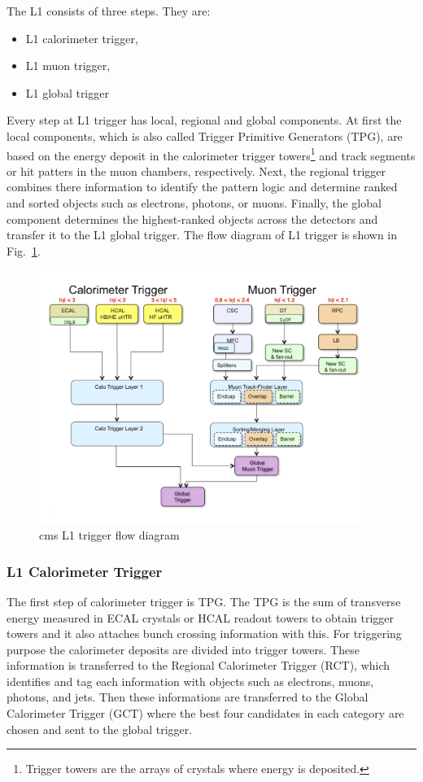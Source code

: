 The L1 consists of three steps. They are:
\begin{itemize}
	\item L1 calorimeter trigger,
	\item L1 muon trigger,
	\item L1 global trigger
\end{itemize}
Every step at L1 trigger has local, regional and global components. At first the local components, which is also called Trigger Primitive Generators (TPG), are based on the energy deposit in the calorimeter trigger towers\footnote{Trigger towers are the arrays of crystals where energy is deposited.} and track segments or hit patters in the muon chambers, respectively. Next, the regional trigger combines there information to identify the pattern logic and determine ranked and sorted objects such as electrons, photons, or muons. Finally, the global component determines the highest-ranked objects across the detectors and transfer it to the L1 global trigger. The flow diagram of L1 trigger is shown in Fig.~\ref{fig:cms-L1-trigger}.
\begin{figure}[htbp]
	\centering
	\includegraphics[width=0.95\textwidth]{figures/LHC/TriggerBlockDiagram_Eta.jpg}
	\caption{cms L1 trigger flow diagram~\cite{L1trigger-2013}}
	\label{fig:cms-L1-trigger}
\end{figure}


\subsubsection{L1 Calorimeter Trigger} %
\label{ssub:l1_calorimeter_trigger}
The first step of calorimeter trigger is TPG. The TPG is the sum of transverse energy measured in ECAL crystals or HCAL readout towers to obtain trigger towers and it also attaches bunch crossing information with this. For triggering purpose the calorimeter deposits are divided into trigger towers. These information is transferred to the Regional Calorimeter Trigger (RCT), which identifies and tag each information with objects such as electrons, muons, photons, and jets. Then these informations are transferred to the Global Calorimeter Trigger (GCT) where the best four candidates in each category are chosen and sent to the global trigger.

